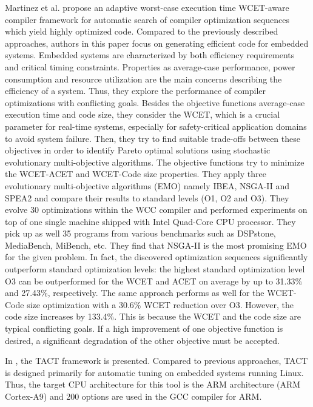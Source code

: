 Martinez et al.\cite{martinez2014multi} propose an adaptive worst-case execution time WCET-aware compiler framework for automatic search of compiler optimization sequences which yield highly optimized code. 
Compared to the previously described approaches, authors in this paper focus on generating efficient code for embedded systems. Embedded systems are characterized by both efficiency requirements and critical timing constraints. Properties as average-case performance, power consumption and resource utilization are the main concerns describing the efficiency of a system. 
Thus, they explore the performance of compiler optimizations with conflicting goals. 
Besides the objective functions average-case execution time and code size, they consider the WCET, which is a crucial parameter for real-time systems, especially for safety-critical application domains to avoid system failure. 
Then, they try to find suitable trade-offs between these objectives in order to identify Pareto optimal solutions using stochastic evolutionary multi-objective algorithms. The objective functions try to minimize the WCET-ACET and WCET-Code size properties. They apply three evolutionary multi-objective algorithms (EMO) namely IBEA, NSGA-II and SPEA2 and compare their results to standard levels (O1, O2 and O3). 
They evolve 30 optimizations within the WCC compiler and performed experiments on top of one single machine shipped with Intel Quad-Core CPU processor. They pick up as well 35  programs from various benchmarks such as DSPstone, MediaBench, MiBench, etc.
They find that NSGA-II is the most promising EMO for the given problem. In fact, the discovered optimization sequences significantly outperform standard optimization levels:
the highest standard optimization level O3 can be outperformed for the WCET and ACET on average by up to 31.33\% and 27.43\%, respectively. The same approach performs as well for the WCET-Code size optimization with a 30.6\% WCET reduction over O3. However, the code size increases by 133.4\%. This is because the WCET and the code size are typical conflicting goals. If a high improvement of one objective function is desired, a significant degradation of the other objective must be accepted.

In \cite{plotnikov2013automatic}, the TACT framework is presented. 
Compared to previous approaches, TACT is designed primarily for automatic tuning on embedded systems running Linux. Thus, the target CPU architecture for this tool is the ARM architecture (ARM Cortex-A9) and 200 options are used in the GCC compiler for ARM. 

